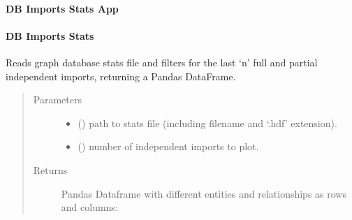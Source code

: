 \documentclass[letterpaper,10pt,english]{sphinxmanual}
\begin{document}
\paragraph{DB Imports Stats App}
\label{\detokenize{_autosummary/report_manager.apps:db-imports-stats-app}}

\paragraph{DB Imports Stats}
\label{\detokenize{_autosummary/report_manager.apps:module-report_manager.apps.imports}}\label{\detokenize{_autosummary/report_manager.apps:db-imports-stats}}

\begin{fulllineitems}
\label{\detokenize{_autosummary/report_manager.apps:report_manager.apps.imports.get_stats_data}}
Reads graph database stats file and filters for the last ‘n’ full and partial independent     imports, returning a Pandas DataFrame.
\begin{quote}\begin{description}
\item[{Parameters}] \leavevmode\begin{itemize}
\item {} 
 () \textendash{} path to stats file (including filename and ‘.hdf’ extension).

\item {} 
 () \textendash{} number of independent imports to plot.

\end{itemize}

\item[{Returns}] \leavevmode
Pandas Dataframe with different entities and relationships as rows and columns:

\end{description}\end{quote}

\end{fulllineitems}
\end{document}

